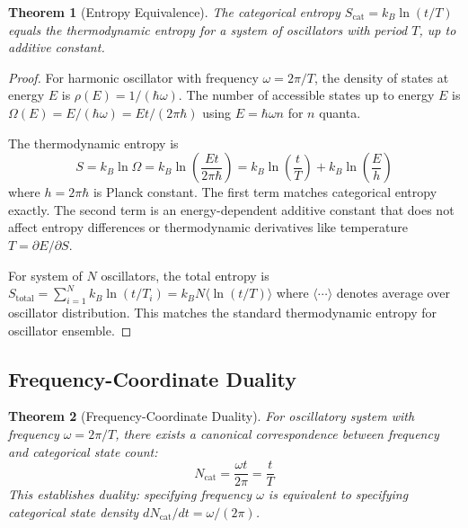 \documentclass[twocolumn,10pt]{article}
\newtheorem{theorem}{Theorem}[section]
\begin{document}
\begin{theorem}[Entropy Equivalence]
\label{thm:entropy_equivalence}
The categorical entropy $S_{\text{cat}} = k_B \ln(t/T)$ equals the thermodynamic entropy for a system of oscillators with period $T$, up to additive constant.
\end{theorem}

\begin{proof}
For harmonic oscillator with frequency $\omega = 2\pi/T$, the density of states at energy $E$ is $\rho(E) = 1/(\hbar \omega)$. The number of accessible states up to energy $E$ is $\Omega(E) = E/(\hbar \omega) = Et/(2\pi\hbar)$ using $E = \hbar \omega n$ for $n$ quanta.

The thermodynamic entropy is
\begin{equation}
S = k_B \ln \Omega = k_B \ln\left(\frac{Et}{2\pi\hbar}\right) = k_B \ln\left(\frac{t}{T}\right) + k_B \ln\left(\frac{E}{h}\right)
\end{equation}
where $h = 2\pi\hbar$ is Planck constant. The first term matches categorical entropy exactly. The second term is an energy-dependent additive constant that does not affect entropy differences or thermodynamic derivatives like temperature $T = \partial E/\partial S$.

For system of $N$ oscillators, the total entropy is $S_{\text{total}} = \sum_{i=1}^N k_B \ln(t/T_i) = k_B N \langle \ln(t/T) \rangle$ where $\langle \cdots \rangle$ denotes average over oscillator distribution. This matches the standard thermodynamic entropy for oscillator ensemble.
\end{proof}

\subsection{Frequency-Coordinate Duality}

\begin{theorem}[Frequency-Coordinate Duality]
\label{thm:frequency_coordinate}
For oscillatory system with frequency $\omega = 2\pi/T$, there exists a canonical correspondence between frequency and categorical state count:
\begin{equation}
N_{\text{cat}} = \frac{\omega t}{2\pi} = \frac{t}{T}
\end{equation}
This establishes duality: specifying frequency $\omega$ is equivalent to specifying categorical state density $dN_{\text{cat}}/dt = \omega/(2\pi)$.
\end{theorem}
\end{document}
